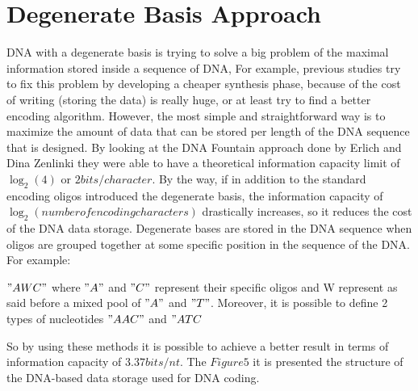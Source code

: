 \documentclass[10pt,twocolumn,twoside]{gsajnl}
\begin{document}
\section{Degenerate Basis Approach}
DNA with a degenerate basis is trying to solve a big problem of the maximal information stored inside a sequence of DNA, For example, previous studies try to fix this problem by developing a cheaper synthesis phase, because of the cost of writing (storing the data) is really huge, or at least try to find a better encoding algorithm. However, the most simple and straightforward way is to maximize the amount of data that can be stored per length of the DNA sequence that is designed. 
By looking at the DNA Fountain approach done by Erlich and Dina Zenlinki they were able to have a theoretical information capacity limit of $\log_{2}(4)$ or $2bits/character$.
By the way, if in addition to the standard encoding oligos introduced the degenerate basis, the information capacity of $\log_{2}(number of encoding characters)$ drastically increases, so it reduces the cost of the DNA data storage.
Degenerate bases are stored in the DNA sequence when oligos are grouped together at some specific position in the sequence of the DNA.
\\For example:
\begin{center}
$"AWC"$ where $"A"$ and $"C"$ represent their specific oligos and W represent as said before a mixed pool of $"A"$ and $"T"$. Moreover, it is possible to define 2 types of nucleotides $"AAC"$ and $"ATC$ 
\end{center}
So by using these methods it is possible to achieve a better result in terms of information capacity of $3.37 bits/nt$.
The $Figure 5$ it is presented the structure of the DNA-based data storage used for DNA coding.
\end{document}
